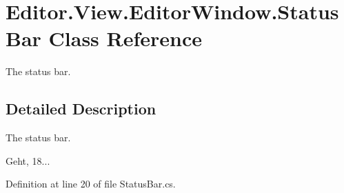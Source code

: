 \section{Editor.\-View.\-Editor\-Window.\-Status\-Bar Class Reference}
\label{class_editor_1_1_view_1_1_editor_window_1_1_status_bar}


The status bar.  




\subsection{Detailed Description}
The status bar. 

Geht, 18... 

Definition at line 20 of file Status\-Bar.\-cs.

